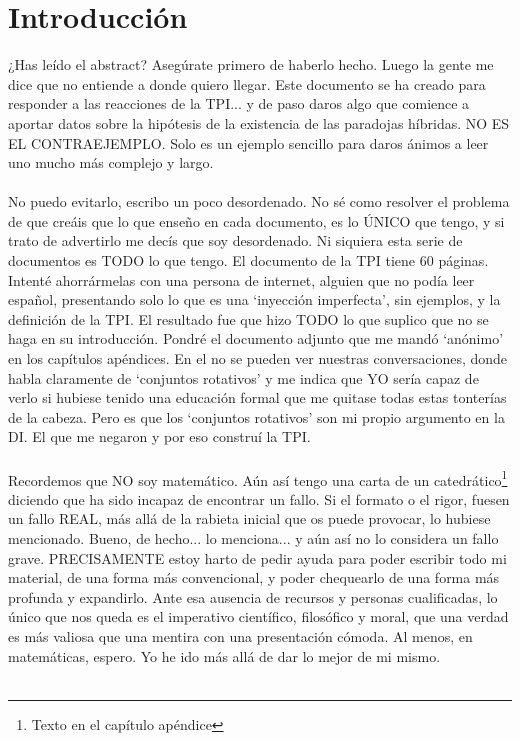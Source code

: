 \chapter{Introducción}

	\noindent
	¿Has leído el abstract? Asegúrate primero de haberlo hecho. Luego la gente me dice que no entiende a donde quiero llegar. Este documento se ha creado para responder a las reacciones de la TPI... y de paso daros algo que comience a aportar datos sobre la hipótesis de la existencia de las paradojas híbridas. NO ES EL CONTRAEJEMPLO. Solo es un ejemplo sencillo para daros ánimos a leer uno mucho más complejo y largo.\\\\
	
	\noindent
	No puedo evitarlo, escribo un poco desordenado. No sé como resolver el problema de que creáis que lo que enseño en cada documento, es lo ÚNICO que tengo, y si trato de advertirlo me decís que soy desordenado. Ni siquiera esta serie de documentos es TODO lo que tengo. El documento de la TPI tiene 60 páginas. Intenté ahorrármelas con una persona de internet, alguien que no podía leer español, presentando solo lo que es una `inyección imperfecta', sin ejemplos, y la definición de la TPI. El resultado fue que hizo TODO lo que suplico que no se haga en su introducción. Pondré el documento adjunto que me mandó `anónimo' en los capítulos apéndices. En el no se pueden ver nuestras conversaciones, donde habla claramente de `conjuntos rotativos' y me indica que YO sería capaz de verlo si hubiese tenido una educación formal que me quitase todas estas tonterías de la cabeza. Pero es que los `conjuntos rotativos' son mi propio argumento en la DI. El que me negaron y por eso construí la TPI.\\\\
	
	\noindent
	Recordemos que NO soy matemático. Aún así tengo una carta de un catedrático\footnote{Texto en el capítulo apéndice} diciendo que ha sido incapaz de encontrar un fallo. Si el formato o el rigor, fuesen un fallo REAL, más allá de la rabieta inicial que os puede provocar, lo hubiese mencionado. Bueno, de hecho... lo menciona... y aún así no lo considera un fallo grave. PRECISAMENTE estoy harto de pedir ayuda para poder escribir todo mi material, de una forma más convencional, y poder chequearlo de una forma más profunda y expandirlo. Ante esa ausencia de recursos y personas cualificadas, lo único que nos queda es el imperativo científico, filosófico y moral, que una verdad es más valiosa que una mentira con una presentación cómoda. Al menos, en matemáticas, espero. Yo he ido más allá de dar lo mejor de mi mismo.\\\\
	

